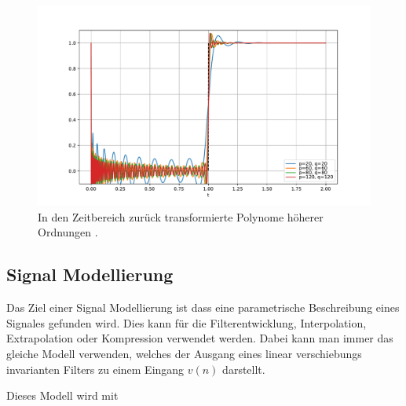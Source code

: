 \begin{figure}
	\centering
	\includegraphics[width=1\linewidth]{./papers/pade/python/bilder/padehigh1.pdf}
	\caption{In den Zeitbereich zurück transformierte Polynome höherer Ordnungen \label{pade:totzeit}.}
\end{figure}


\subsection{Signal Modellierung
	\label{pade:subsection:SignalMod}}

Das Ziel einer Signal Modellierung ist dass eine parametrische Beschreibung eines Signales gefunden wird.
Dies kann für die Filterentwicklung, Interpolation, Extrapolation oder Kompression verwendet werden.
Dabei kann man immer das gleiche Modell verwenden, welches der Ausgang eines linear verschiebungs invarianten Filters zu einem Eingang $v(n)$ darstellt. 
\begin{figure}
	\centering
	\tikzset{>=latex}
\end{figure}
Dieses Modell wird mit

